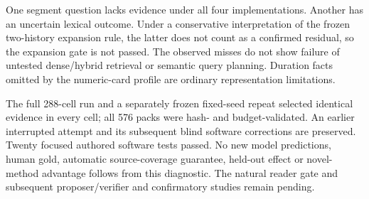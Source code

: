 One segment question lacks evidence under all four implementations. Another
has an uncertain lexical outcome. Under a conservative interpretation of the
frozen two-history expansion rule, the latter does not count as a confirmed
residual, so the expansion gate is not passed. The observed misses do not show
failure of untested dense/hybrid retrieval or semantic query planning. Duration
facts omitted by the numeric-card profile are ordinary representation limitations.

The full 288-cell run and a separately frozen fixed-seed repeat selected identical
evidence in every cell; all 576 packs were hash- and budget-validated. An earlier
interrupted attempt and its subsequent blind software corrections are preserved.
Twenty focused authored software tests passed. No new model predictions, human
gold, automatic source-coverage guarantee, held-out effect or novel-method
advantage follows from this diagnostic. The natural reader gate and subsequent
proposer/verifier and confirmatory studies remain pending.
